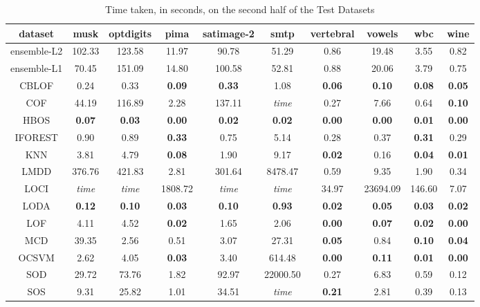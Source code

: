 \begin{table*}[!b]
\renewcommand{\arraystretch}{1.25}
\caption{Time taken, in seconds, on the second half of the Test Datasets}
\label{table:results:test-time-2}
\centering
\begin{tabular}{|c|c|c|c|c|c|c|c|c|c|}
    \hline
    \textbf{dataset} & \textbf{musk} & \textbf{optdigits} & \textbf{pima} & \textbf{satimage-2} & \textbf{smtp} & \textbf{vertebral} & \textbf{vowels} & \textbf{wbc} & \textbf{wine} \\
    \hline
    ensemble-L2 & 102.33 & 123.58 & 11.97 & 90.78 & 51.29 & 0.86 & 19.48 & 3.55 & 0.82 \\
    \hline
    ensemble-L1 & 70.45 & 151.09 & 14.80 & 100.58 & 52.81 & 0.88 & 20.06 & 3.79 & 0.75 \\
    \hline
    CBLOF & 0.24 & 0.33 & \bfseries 0.09 & \bfseries 0.33 & 1.08 & \bfseries 0.06 & \bfseries 0.10 & \bfseries 0.08 & \bfseries 0.05 \\
    \hline
    COF & 44.19 & 116.89 & 2.28 & 137.11 & \textit{time} & 0.27 & 7.66 & 0.64 & \bfseries 0.10 \\
    \hline
    HBOS & \bfseries 0.07 & \bfseries 0.03 & \bfseries 0.00 & \bfseries 0.02 & \bfseries 0.02 & \bfseries 0.00 & \bfseries 0.00 & \bfseries 0.01 & \bfseries 0.00 \\
    \hline
    IFOREST & 0.90 & 0.89 & \bfseries 0.33 & 0.75 & 5.14 & 0.28 & 0.37 & \bfseries 0.31 & 0.29 \\
    \hline
    KNN & 3.81 & 4.79 & \bfseries 0.08 & 1.90 & 9.17 & \bfseries 0.02 & 0.16 & \bfseries 0.04 & \bfseries 0.01 \\
    \hline
    LMDD & 376.76 & 421.83 & 2.81 & 301.64 & 8478.47 & 0.59 & 9.35 & 1.90 & 0.34 \\
    \hline
    LOCI & \textit{time} & \textit{time} & 1808.72 & \textit{time} & \textit{time} & 34.97 & 23694.09 & 146.60 & 7.07 \\
    \hline
    LODA & \bfseries 0.12 & \bfseries 0.10 & \bfseries 0.03 & \bfseries 0.10 & \bfseries 0.93 & \bfseries 0.02 & \bfseries 0.05 & \bfseries 0.03 & \bfseries 0.02 \\
    \hline
    LOF & 4.11 & 4.52 & \bfseries 0.02 & 1.65 & 2.06 & \bfseries 0.00 & \bfseries 0.07 & \bfseries 0.02 & \bfseries 0.00 \\
    \hline
    MCD & 39.35 & 2.56 & 0.51 & 3.07 & 27.31 & \bfseries 0.05 & 0.84 & \bfseries 0.10 & \bfseries 0.04 \\
    \hline
    OCSVM & 2.62 & 4.05 & \bfseries 0.03 & 3.40 & 614.48 & \bfseries 0.00 & \bfseries 0.11 & \bfseries 0.01 & \bfseries 0.00 \\
    \hline
    SOD & 29.72 & 73.76 & 1.82 & 92.97 & 22000.50 & 0.27 & 6.83 & 0.59 & 0.12 \\
    \hline
    SOS & 9.31 & 25.82 & 1.01 & 34.51 & \textit{time} & \bfseries 0.21 & 2.81 & 0.39 & 0.13 \\
    \hline
\end{tabular}
\end{table*}
